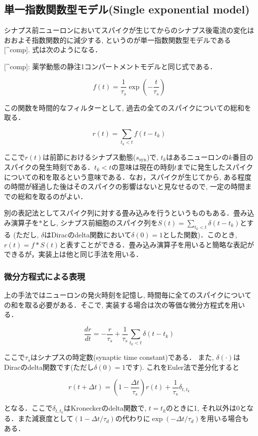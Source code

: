 \subsection{単一指数関数型モデル(Single exponential model)}
シナプス前ニューロンにおいてスパイクが生じてからのシナプス後電流の変化はおおよそ指数関数的に減少する, というのが単一指数関数型モデルである [^comp]. 式は次のようになる．

[^comp]: 薬学動態の静注1コンパートメントモデルと同じ式である．


\begin{equation}
f(t)=\frac{1}{\tau_{s}}\exp\left(-\frac{t}{\tau_s}\right)    
\end{equation}


この関数を時間的なフィルターとして, 過去の全てのスパイクについての総和を取る．


\begin{equation}
r(t)=\sum_{t_{k}< t} f\left(t-t_{k}\right)
\end{equation}


ここで${r(t)}$は前節におけるシナプス動態($s_{\text{syn}}$)で, $t_{k}$はあるニューロンの$k$番目のスパイクの発生時刻である．${t_{k}<t}$の意味は現在の時刻$t$までに発生したスパイクについての和を取るという意味である．なお，スパイクが生じてから, ある程度の時間が経過した後はそのスパイクの影響はないと見なせるので, 一定の時間までの総和を取るのがよい．

別の表記法としてスパイク列に対する畳み込みを行うというものもある．畳み込み演算子を$*$とし, シナプス前細胞のスパイク列を$S(t)=\sum_{t_{k}< t} \delta\left(t-t_{k}\right)$とする (ただし, $\delta$はDiracのdelta関数において$\delta(0)=1$とした関数)．このとき, $r(t)=f*S(t)$と表すことができる．畳み込み演算子を用いると簡略な表記ができるが，実装上は他と同じ手法を用いる．

\subsubsection{微分方程式による表現}
上の手法ではニューロンの発火時刻を記憶し, 時間毎に全てのスパイクについての和を取る必要がある．そこで, 実装する場合は次の等価な微分方程式を用いる．


\begin{equation}
\frac{dr}{dt}=-\frac{r}{\tau_{s}}+\frac{1}{\tau_{s}} \sum_{t_{k}< t} \delta\left(t-t_{k}\right)   
\end{equation}


ここで$\tau_s$はシナプスの時定数(synaptic time constant)である． また, $\delta(\cdot)$はDiracのdelta関数です(ただし$\delta(0)=1$です). これをEuler法で差分化すると 


\begin{equation}
r(t+\Delta t)=\left(1-\frac{\Delta t}{\tau_{s}}\right)r(t)+\frac{1}{\tau_{s}}\delta_{t,t_{k}} 
\end{equation}


となる．ここで$\delta_{t,t_{k}}$はKroneckerのdelta関数で, $t=t_{k}$のときに1, それ以外は0となる．また減衰度として$\left(1-\Delta  t/\tau_{d}\right)$の代わりに$\exp\left(-\Delta t/\tau_{d}\right)$を用いる場合もある．
